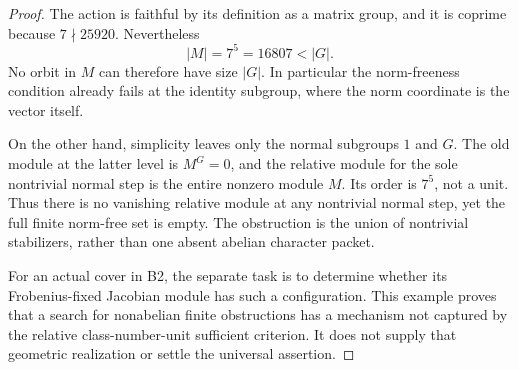 \begin{proof}
The action is faithful by its definition as a matrix group,
and it is coprime because $7\nmid25920$. Nevertheless
\[
                         |M|=7^5=16807<|G|.
\]
No orbit in $M$ can therefore have size $|G|$. In particular
the norm-freeness condition already fails at the identity
subgroup, where the norm coordinate is the vector itself.

On the other hand, simplicity leaves only the normal
subgroups $1$ and $G$. The old module at the latter level is
$M^G=0$, and the relative module for the sole nontrivial
normal step is the entire nonzero module $M$. Its order is
$7^5$, not a unit. Thus there is no vanishing relative module
at any nontrivial normal step, yet the full finite norm-free
set is empty. The obstruction is the union of nontrivial
stabilizers, rather than one absent abelian character packet.

For an actual cover in B2, the separate task is to determine
whether its Frobenius-fixed Jacobian module has such a
configuration. This example proves that a search for
nonabelian finite obstructions has a mechanism not captured
by the relative class-number-unit sufficient criterion. It
does not supply that geometric realization or settle the
universal assertion.
\end{proof}
